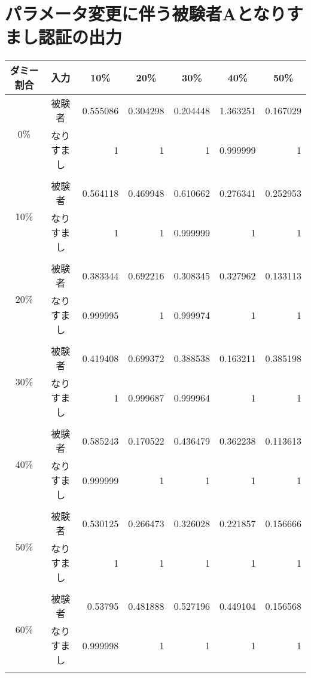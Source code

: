 \section{パラメータ変更に伴う被験者Aとなりすまし認証の出力}
\begin{center}
  \begin{longtable}[btph]{|c|c|r|r|r|r|r|}
    \hline
      \multicolumn{1}{|c|}{ダミー割合} & \multicolumn{1}{c|}{入力} & \multicolumn{1}{c|}{10\%} & \multicolumn{1}{c|}{20\%} & \multicolumn{1}{c|}{30\%} & \multicolumn{1}{c|}{40\%} & \multicolumn{1}{c|}{50\%} \\ \hline \hline
      \multirow{2}{*}{0\%}  & 被験者 & 0.555086 & 0.304298 & 0.204448 & 1.363251 & 0.167029 \\
           & なりすまし & 1 & 1 & 1 & 0.999999 & 1 \\ \cline{2-7} \\ \hline
      \multirow{2}{*}{10\%} & 被験者 & 0.564118 & 0.469948 & 0.610662 & 0.276341 & 0.252953 \\
           & なりすまし & 1 & 1 & 0.999999 & 1 & 1 \\ \cline{2-7} \\ \hline
      \multirow{2}{*}{20\%} & 被験者 & 0.383344 & 0.692216 & 0.308345 & 0.327962 & 0.133113 \\
           & なりすまし & 0.999995 & 1 & 0.999974 & 1 & 1 \\ \cline{2-7} \\ \hline
      \multirow{2}{*}{30\%} & 被験者 & 0.419408 & 0.699372 & 0.388538 & 0.163211 & 0.385198 \\
           & なりすまし & 1 & 0.999687 & 0.999964 & 1 & 1 \\ \cline{2-7} \\ \hline
      \multirow{2}{*}{40\%} & 被験者 & 0.585243 & 0.170522 & 0.436479 & 0.362238 & 0.113613 \\
           & なりすまし & 0.999999 & 1 & 1 & 1 & 1 \\ \cline{2-7} \\ \hline
      \multirow{2}{*}{50\%} & 被験者 & 0.530125 & 0.266473 & 0.326028 & 0.221857 & 0.156666 \\
           & なりすまし & 1 & 1 & 1 & 1 & 1 \\ \cline{2-7} \\ \hline
      \multirow{2}{*}{60\%} & 被験者 & 0.53795  & 0.481888 & 0.527196 & 0.449104 & 0.156568 \\
           & なりすまし & 0.999998 & 1 & 1 & 1 & 1 \\ \cline{2-7} \\ \hline

\end{longtable}
\end{center}
